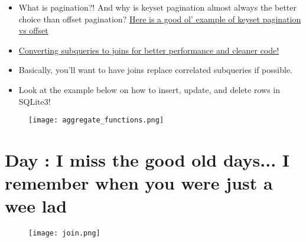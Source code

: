 \documentclass{42-en}
\begin{document}
	\begin{itemize}\itemsep1pt
		\item What is pagination?! And why is keyset pagination almost always the better choice than offset pagination?
			\href{http://allyouneedisbackend.com/blog/2017/09/24/the-sql-i-love-part-1-scanning-large-table/}{Here 				is a good ol' example of keyset pagination vs offset}
		\item \href{https://academy.vertabelo.com/blog/converting-subqueries-joins/}{Converting subqueries to joins for better performance and cleaner code!}
		\item Basically, you'll want to have joins replace correlated subqueries if possible. 
		\item Look at the example below on how to insert, update, and delete rows in SQLite3! 
	\end{itemize}

            \begin{figure}[H]
                \begin{center}
                    \texttt{[image: aggregate\_functions.png]}
                \end{center}
            \end{figure}

\nextexercice


\chapter{Day \exercicenumber: I miss the good old days... I remember when you were just a wee lad }

\makeheaderfiles

            \begin{figure}[H]
                \begin{center}
                    \texttt{[image: join.png]}
                \end{center}
            \end{figure}
\end{document}
